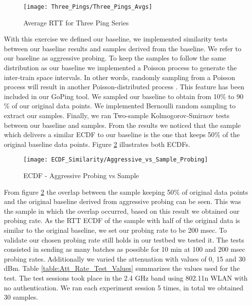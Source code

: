 \begin{figure}[h]
	\centering
	\texttt{[image: Three\_Pings/Three\_Pings\_Avgs]}
	\caption{Average RTT for Three Ping Series}
	\label{image:Avg_RTT_Three_Pings}
\end{figure}

With this exercise we defined our baseline, we implemented similarity tests between our baseline results and samples derived from the baseline. We refer to our baseline as aggressive probing. To keep the samples to follow the same distribution as our baseline we implemented a Poisson process to generate the inter-train space intervals. In other words, randomly sampling from a Poisson process will result in another Poisson-distributed process \cite{raikov_decomposition}. This feature has been included in our GoPing tool. We sampled our baseline to obtain from 10\% to 90 \% of our original data points. We implemented Bernoulli random sampling to extract our samples. Finally, we ran Two-sample Kolmogorov-Smirnov tests between our baseline and samples. From the results we noticed that the sample which delivers a similar ECDF to our baseline is the one that keeps 50\% of the original baseline data points. Figure \ref{image:ECDF_aggressive_vs_sampling} illustrates both ECDFs.

\begin{figure}[h]
	\centering
	\texttt{[image: ECDF\_Similarity/Aggressive\_vs\_Sample\_Probing]}
	\caption{ECDF - Aggressive Probing vs Sample}
	\label{image:ECDF_aggressive_vs_sampling}
\end{figure}

From figure \ref{image:ECDF_aggressive_vs_sampling} the overlap between the sample keeping 50\% of original data points and the original baseline derived from aggressive probing can be seen. This was the sample in which the overlap occurred, based on this result we obtained our probing rate. As the RTT ECDF of the sample with half of the original data is similar to the original baseline, we set our probing rate to be 200 msec. To validate our chosen probing rate still holds in our testbed we tested it. The tests consisted in sending as many batches as possible for 10 min at 100 and 200 msec probing rates. Additionally we varied the attenuation with values of 0, 15 and 30 dBm. Table \ref{table:Att_Rate_Test_Values} summarizes the values used for the test. The test sessions took place in the 2.4 GHz band using 802.11n WLAN with no authentication. We ran each experiment session 5 times, in total we obtained 30 samples.

